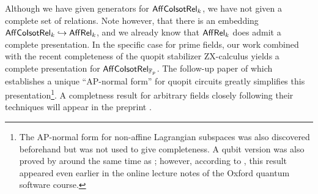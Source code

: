  
Although we have given generators for $\mathsf{Aff}{\sf Co}{\sf Isot}\mathsf{Rel}_k$, we have not given a complete set of relations.  Note however, that there is an embedding $\mathsf{Aff}{\sf Co}{\sf Isot}\mathsf{Rel}_k\hookrightarrow \mathsf{Aff}\mathsf{Rel}_k$, and we already know that $\mathsf{Aff}\mathsf{Rel}_k$ does admit a complete presentation.  In the specific case for prime fields, our work combined with the recent completeness of the quopit stabilizer ZX-calculus \cite{booth} yields a complete presentation for $\mathsf{Aff}{\sf Co}{\sf Isot}\mathsf{Rel}_{\mathbb{F}_p}$. The follow-up paper of \cite{poor} which establishes a unique ``AP-normal form'' for quopit circuits greatly simplifies this presentation\footnote{The AP-normal form for non-affine Lagrangian subspaces was also discovered beforehand  \cite{amolak} but was not used to give completeness.  A qubit version was also proved by  \cite{McElvanney2023} around the same time as \cite{amolak}; however, according to \cite{booth}, this result appeared even earlier in the online lecture notes of the Oxford quantum software course.}.
A completness result for arbitrary fields closely following their techniques will appear in the preprint  \cite{ribtccc}.

%
%
%




